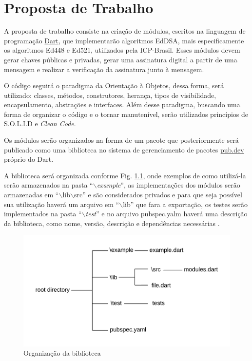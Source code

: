 \chapter[Proposta de Trabalho]{Proposta de Trabalho}

A proposta de trabalho consiste na criação de módulos, escritos na linguagem de programação \href{https://dart.dev/}{Dart}, que implementarão algoritmos EdDSA, mais especificamente os algoritmos Ed448 e Ed521, utilizados pela ICP-Brasil. Esses módulos devem gerar chaves públicas e privadas, gerar uma assinatura digital a partir de uma mensagem e realizar a verificação da assinatura junto à mensagem. 

O código seguirá o paradigma da Orientação à Objetos, dessa forma, será utilizado: classes, métodos, construtores, herança, tipos de visibilidade, encapsulamento, abstrações e interfaces. Além desse paradigma, buscando uma forma de organizar o código e o tornar manutenível, serão utilizados princípios de S.O.L.I.D e \textit{Clean Code}.    

Os módulos serão organizados na forma de um pacote que posteriormente será publicado como uma biblioteca no sistema de gerenciamento de pacotes \href{https://pub.dev/}{pub.dev} próprio do Dart. 

A biblioteca será organizada conforme Fig. \ref{estrutura}, onde exemplos de como utilizá-la serão armazenados na pasta ``$\backslash$\textit{example}'', as implementações dos módulos serão armazenadas em ``$\backslash$lib$\backslash$src'' e são considerados privados e para que seja possível sua utilização haverá um arquivo em ``$\backslash$lib'' que fara a exportação, os testes serão implementados na pasta ``$\backslash$\textit{test}'' e no arquivo pubspec.yalm haverá uma descrição da biblioteca, como nome, versão, descrição e dependências necessárias .

\begin{figure}[h]
	\centering
	\includegraphics[keepaspectratio=true,scale=1.1]{figuras/organização biblioteca.png}
	\caption{Organização da biblioteca}
	\label{estrutura}
\end{figure}
